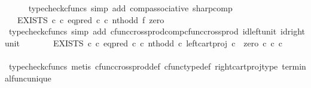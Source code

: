 \begin{isabellebody}
\ \ \ \ \isamarkupfalse%
\ {\isacharparenleft}{\kern0pt}typecheck{\isacharunderscore}{\kern0pt}cfuncs{\isacharcomma}{\kern0pt}\ simp\ add{\isacharcolon}{\kern0pt}\ comp{\isacharunderscore}{\kern0pt}associative{}\ sharp{\isacharunderscore}{\kern0pt}comp{\isacharparenright}{\kern0pt}\isanewline
\ \ \isamarkupfalse%
\ \isamarkupfalse%
\ {\isachardoublequoteopen}{\isachardot}{\kern0pt}{\isachardot}{\kern0pt}{\isachardot}{\kern0pt}\ {\isacharequal}{\kern0pt}\ EXISTS\ {\isasymnat}\isactrlsub c\ {\isasymcirc}\isactrlsub c\ {\isacharparenleft}{\kern0pt}eq{\isacharunderscore}{\kern0pt}pred\ {\isasymnat}\isactrlsub c\ {\isasymcirc}\isactrlsub c\ {\isacharparenleft}{\kern0pt}nth{\isacharunderscore}{\kern0pt}odd\ {\isasymtimes}\isactrlsub f\ zero{\isacharparenright}{\kern0pt}{\isacharparenright}{\kern0pt}\isactrlsup {\isasymsharp}{\isachardoublequoteclose}\isanewline
\ \ \ \ \isamarkupfalse%
\ {\isacharparenleft}{\kern0pt}typecheck{\isacharunderscore}{\kern0pt}cfuncs{\isacharcomma}{\kern0pt}\ simp\ add{\isacharcolon}{\kern0pt}\ cfunc{\isacharunderscore}{\kern0pt}cross{\isacharunderscore}{\kern0pt}prod{\isacharunderscore}{\kern0pt}comp{\isacharunderscore}{\kern0pt}cfunc{\isacharunderscore}{\kern0pt}cross{\isacharunderscore}{\kern0pt}prod\ id{\isacharunderscore}{\kern0pt}left{\isacharunderscore}{\kern0pt}unit{}\ id{\isacharunderscore}{\kern0pt}right{\isacharunderscore}{\kern0pt}unit{}{\isacharparenright}{\kern0pt}\isanewline
\ \ \isamarkupfalse%
\ \isamarkupfalse%
\ {\isachardoublequoteopen}{\isachardot}{\kern0pt}{\isachardot}{\kern0pt}{\isachardot}{\kern0pt}\ {\isacharequal}{\kern0pt}\ EXISTS\ {\isasymnat}\isactrlsub c\ {\isasymcirc}\isactrlsub c\ {\isacharparenleft}{\kern0pt}eq{\isacharunderscore}{\kern0pt}pred\ {\isasymnat}\isactrlsub c\ {\isasymcirc}\isactrlsub c\ {\isasymlangle}nth{\isacharunderscore}{\kern0pt}odd\ {\isasymcirc}\isactrlsub c\ left{\isacharunderscore}{\kern0pt}cart{\isacharunderscore}{\kern0pt}proj\ {\isasymnat}\isactrlsub c\ {\isasymone}{\isacharcomma}{\kern0pt}\ zero\ {\isasymcirc}\isactrlsub c\ {\isasymbeta}\isactrlbsub {\isasymnat}\isactrlsub c\ {\isasymtimes}\isactrlsub c\ {\isasymone}\isactrlesub {\isasymrangle}\ {\isacharparenright}{\kern0pt}\isactrlsup {\isasymsharp}{\isachardoublequoteclose}\isanewline
\ \ \ \ \isamarkupfalse%
\ {\isacharparenleft}{\kern0pt}typecheck{\isacharunderscore}{\kern0pt}cfuncs{\isacharcomma}{\kern0pt}\ metis\ cfunc{\isacharunderscore}{\kern0pt}cross{\isacharunderscore}{\kern0pt}prod{\isacharunderscore}{\kern0pt}def\ cfunc{\isacharunderscore}{\kern0pt}type{\isacharunderscore}{\kern0pt}def\ right{\isacharunderscore}{\kern0pt}cart{\isacharunderscore}{\kern0pt}proj{\isacharunderscore}{\kern0pt}type\ terminal{\isacharunderscore}{\kern0pt}func{\isacharunderscore}{\kern0pt}unique{\isacharparenright}{\kern0pt}\isanewline

\end{isabellebody}
